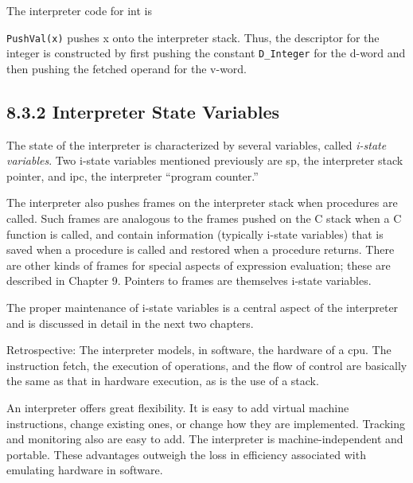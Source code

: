 
The interpreter code for int is

\goodbreak
{}

\texttt{PushVal(x)} pushes x onto the interpreter stack. Thus, the descriptor
for the integer is constructed by first pushing the constant \texttt{D\_Integer}
for the d-word and then pushing the fetched operand for the v-word.

\subsection[8.3.2 Interpreter State Variables]{8.3.2 Interpreter State Variables}

The state of the interpreter is characterized by several variables,
called \textit{i-state variables}. Two i-state variables mentioned
previously are sp, the interpreter stack pointer, and ipc, the
interpreter ``program counter.''

The interpreter also pushes frames on the interpreter stack when
procedures are called. Such frames are analogous to the frames pushed
on the C stack when a C function is called, and contain information
(typically i-state variables) that is saved when a procedure is called
and restored when a procedure returns. There are other kinds of frames
for special aspects of expression evaluation; these are described in
Chapter 9. Pointers to frames are themselves i-state variables.

The proper maintenance of i-state variables is a central aspect of the
interpreter and is discussed in detail in the next two chapters.

Retrospective: The interpreter models, in software, the hardware of a
cpu. The instruction fetch, the execution of operations, and the flow
of control are basically the same as that in hardware execution, as is
the use of a stack.

An interpreter offers great flexibility. It is easy to add virtual
machine instructions, change existing ones, or change how they are
implemented. Tracking and monitoring also are easy to add. The
interpreter is machine-independent and portable. These advantages
outweigh the loss in efficiency associated with emulating hardware in
software.

